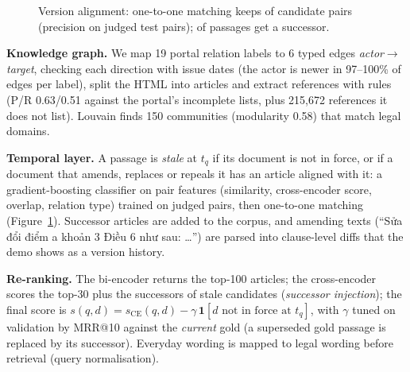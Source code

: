 \documentclass{article} %
\begin{document}
\begin{figure}
\vspace{-5mm}
\centering
{}
\vspace{-2mm}
\caption{Version alignment: one-to-one matching keeps \ResAlignArtAccepted{} of \ResAlignArtPairs{} candidate pairs
(precision \ResAlignPrec{} on judged test pairs); \ResAlignAccepted{} of \ResAlignPairs{} passages get a successor.}
\label{fig:align}
\vspace{-4mm}
\end{figure}
\textbf{Knowledge graph.} We map 19 portal relation labels to 6 typed edges \emph{actor$\to$target}, checking each
direction with issue dates (the actor is newer in 97--100\% of edges per label), split the HTML into articles and extract
references with rules (P/R 0.63/0.51 against the portal's incomplete lists, plus 215,672 references it does not list).
Louvain finds 150 communities (modularity 0.58) that match legal domains.

\textbf{Temporal layer.} A passage is \emph{stale} at $t_q$ if its document is not in force, or if a document that
amends, replaces or repeals it has an article aligned with it: a gradient-boosting classifier on pair features
(similarity, cross-encoder score, overlap, relation type) trained on \ResAlignJudged{} judged pairs, then one-to-one
matching (Figure~\ref{fig:align}). Successor
articles are added to the corpus, and amending texts (``Sửa đổi điểm a khoản 3 Điều 6 như sau: \dots'') are parsed into
clause-level diffs that the demo shows as a version history.

\textbf{Re-ranking.} The bi-encoder returns the top-100 articles; the cross-encoder scores the top-30 plus the
successors of stale candidates (\emph{successor injection}); the final score is
$s(q,d) = s_{\mathrm{CE}}(q,d) - \gamma\,\mathbf{1}[d \text{ not in force at } t_q]$, with $\gamma$ tuned on validation by MRR@10 against the \emph{current} gold (a superseded gold passage is replaced by its
successor). Everyday wording is mapped to legal wording before retrieval (query normalisation).
\end{document}
